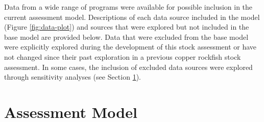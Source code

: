 \documentclass[11pt,
  english,
  letterpaper,
]{article}
\begin{document}
Data from a wide range of programs were available for possible inclusion in the current assessment model. Descriptions of each data source included in the model (Figure \ref{fig:data-plot}) and sources that were explored but not included in the base model are provided below. Data that were excluded from the base model were explicitly explored during the development of this stock assessment or have not changed since their past exploration in a previous copper rockfish stock assessment. In some cases, the inclusion of excluded data sources were explored through sensitivity analyses (see Section \ref{assessment-model}).

\hypertarget{assessment-model}{%
\section{Assessment Model}\label{assessment-model}}
\end{document}
